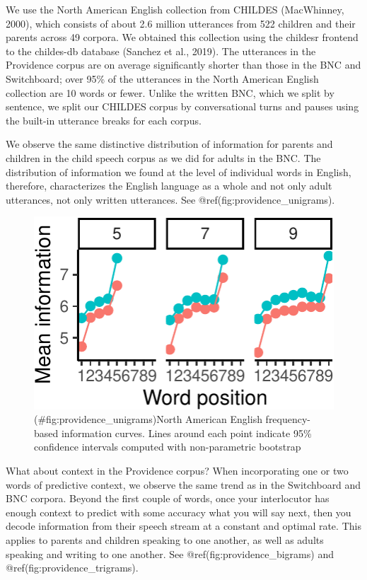 \documentclass[man,floatsintext]{apa6}
\begin{document}
We use the North American English collection from CHILDES (MacWhinney, 2000), which consists of about 2.6 million utterances from 522 children and their parents across 49 corpora. We obtained this collection using the childesr frontend to the childes-db database (Sanchez et al., 2019). The utterances in the Providence corpus are on average significantly shorter than those in the BNC and Switchboard; over 95\% of the utterances in the North American English collection are 10 words or fewer. Unlike the written BNC, which we split by sentence, we split our CHILDES corpus by conversational turns and pauses using the built-in utterance breaks for each corpus.

We observe the same distinctive distribution of information for parents and children in the child speech corpus as we did for adults in the BNC. The distribution of information we found at the level of individual words in English, therefore, characterizes the English language as a whole and not only adult utterances, not only written utterances. See @ref(fig:providence\_unigrams).

\begin{figure}
\centering
\includegraphics{figs/providence_unigrams-1.pdf}
\caption{(\#fig:providence\_unigrams)North American English frequency-based information curves. Lines around each point indicate 95\% confidence intervals computed with non-parametric bootstrap}
\end{figure}

What about context in the Providence corpus? When incorporating one or two words of predictive context, we observe the same trend as in the Switchboard and BNC corpora. Beyond the first couple of words, once your interlocutor has enough context to predict with some accuracy what you will say next, then you decode information from their speech stream at a constant and optimal rate. This applies to parents and children speaking to one another, as well as adults speaking and writing to one another. See @ref(fig:providence\_bigrams) and @ref(fig:providence\_trigrams).
\end{document}
